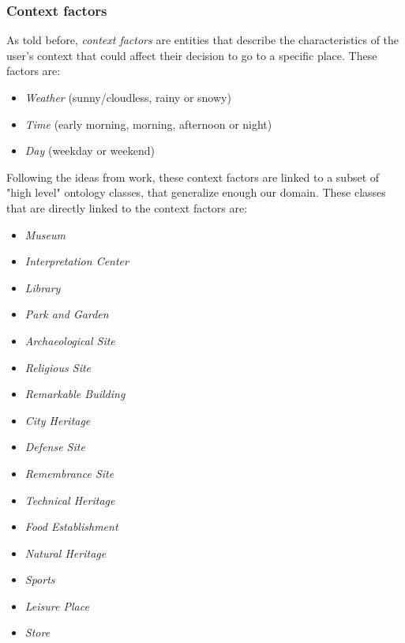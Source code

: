 \subsubsection{Context factors} \label{section:context_factors}
As told before, \textit{context factors} are entities that describe the characteristics of the user's context that could affect their decision to go to a specific place. These factors are: 
\begin{itemize}
    \item \textit{Weather} (sunny/cloudless, rainy or snowy)
    \item \textit{Time} (early morning, morning, afternoon or night)
    \item \textit{Day} (weekday or weekend)
\end{itemize}
Following the ideas from \cite{bahramian_abbaspour_claramunt_2017} work, these context factors are linked to a subset of "high level" ontology classes, that generalize enough our domain. These classes that are directly linked to the context factors are:
\begin{itemize}
    \item \textit{Museum}
    \item \textit{Interpretation Center}
    \item \textit{Library}
    \item \textit{Park and Garden}
    \item \textit{Archaeological Site}
    \item \textit{Religious Site}
    \item \textit{Remarkable Building}
    \item \textit{City Heritage}
    \item \textit{Defense Site}
    \item \textit{Remembrance Site}
    \item \textit{Technical Heritage}
    \item \textit{Food Establishment}
    \item \textit{Natural Heritage}
    \item \textit{Sports}
    \item \textit{Leisure Place}
    \item \textit{Store}
\end{itemize}
 
